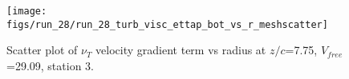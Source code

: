\begin{figure}[H]
\centering
\texttt{[image: figs/run\_28/run\_28\_turb\_visc\_ettap\_bot\_vs\_r\_meshscatter]}
\caption{Scatter plot of $\nu_T$ velocity gradient term vs radius at $z/c$=7.75, $V_{free}$=29.09, station 3.}
\label{fig:run_28_turb_visc_ettap_bot_vs_r_meshscatter}
\end{figure}


